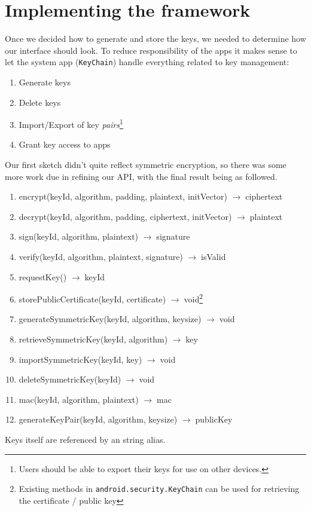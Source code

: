 \documentclass[a4paper,draft]{scrartcl}
\newcommand{\totype}{\(\to\;\)}
\begin{document}
\section{Implementing the framework}
	Once we decided how to generate and store the keys, we needed to determine how our interface should look. To reduce responsibility of the apps it makes sense to let the system app (\texttt{KeyChain}) handle everything related to key management:
	\begin{enumerate}
		\item Generate keys
		\item Delete keys
		\item Import/Export of key \emph{pairs}\footnote{Users should be able to export their keys for use on other devices.}
		\item Grant key access to apps
	\end{enumerate}
	Our first sketch didn't quite reflect symmetric encryption, so there was some more work due in refining our API, with the final result being as followed.
	\begin{enumerate}
	\tt
		\item encrypt(keyId, algorithm, padding, plaintext, initVector) \totype ciphertext
		\item decrypt(keyId, algorithm, padding, ciphertext, initVector) \totype plaintext
		\item sign(keyId, algorithm, plaintext) \totype signature
		\item verify(keyId, algorithm, plaintext, signature) \totype isValid
		\item requestKey() \totype keyId
		\item storePublicCertificate(keyId, certificate) \totype void\footnote{Existing methods in \texttt{android.security.KeyChain} can be used for retrieving the certificate / public key}
		\item generateSymmetricKey(keyId, algorithm, keysize) \totype void
		\item retrieveSymmetricKey(keyId, algorithm) \totype key
		\item importSymmetricKey(keyId, key) \totype void
		\item deleteSymmetricKey(keyId) \totype void
		\item mac(keyId, algorithm, plaintext) \totype mac
		\item generateKeyPair(keyId, algorithm, keysize) \totype publicKey
	\end{enumerate}
	Keys itself are referenced by an string alias.
\end{document}
